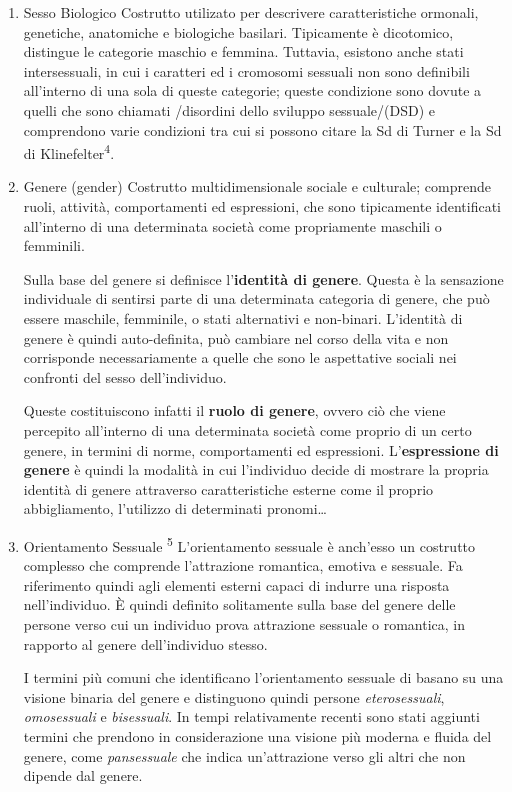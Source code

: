 \documentclass[11pt]{article}
\makeatletter
\newcommand{\cslcitation}[2]
 {\protect\hyper@linkstart{cite}{citeproc_bib_item_#1}#2\hyper@linkend}
\makeatother
\begin{document}
\begin{enumerate}
\item Sesso Biologico
\label{sec:org762db31}
Costrutto utilizato per descrivere caratteristiche ormonali, genetiche, anatomiche e biologiche basilari.
Tipicamente è dicotomico, distingue le categorie maschio e femmina.
Tuttavia, esistono anche stati intersessuali, in cui i caratteri ed i cromosomi sessuali non sono definibili all'interno di una sola di queste categorie; queste condizione sono dovute a quelli che sono chiamati /disordini dello sviluppo sessuale/(DSD) e comprendono varie condizioni tra cui si possono citare la Sd di Turner e la Sd di Klinefelter\textsuperscript{\cslcitation{4}{4}}.
\item Genere (gender)
\label{sec:org4d9569c}
Costrutto multidimensionale sociale e culturale; comprende ruoli, attività, comportamenti ed espressioni, che sono tipicamente identificati all'interno di una determinata società come propriamente maschili o femminili.

Sulla base del genere si definisce l'\textbf{identità di genere}.
Questa è la sensazione individuale di sentirsi parte di una determinata categoria di genere, che può essere maschile, femminile, o stati alternativi e non-binari.
L'identità di genere è quindi auto-definita, può cambiare nel corso della vita e non corrisponde necessariamente a quelle che sono le aspettative sociali nei confronti del sesso dell'individuo.

Queste costituiscono infatti il \textbf{ruolo di genere}, ovvero ciò che viene percepito all'interno di una determinata società come proprio di un certo genere, in termini di norme, comportamenti ed espressioni.
L'\textbf{espressione di genere} è quindi la modalità in cui l'individuo decide di mostrare la propria identità di genere attraverso caratteristiche esterne come il proprio abbigliamento, l'utilizzo di determinati pronomi\ldots{}
\item Orientamento Sessuale \textsuperscript{\cslcitation{5}{5}}
\label{sec:org50bc6a9}
L'orientamento sessuale è anch'esso un costrutto complesso che comprende l'attrazione romantica, emotiva e sessuale.
Fa riferimento quindi agli elementi esterni capaci di indurre una risposta nell'individuo.
È quindi definito solitamente sulla base del genere delle persone verso cui un individuo prova attrazione sessuale o romantica, in rapporto al genere dell'individuo stesso.

I termini più comuni che identificano l'orientamento sessuale di basano su una visione binaria del genere e distinguono quindi persone \emph{eterosessuali}, \emph{omosessuali} e \emph{bisessuali}.
In tempi relativamente recenti sono stati aggiunti termini che prendono in considerazione una visione più moderna e fluida del genere, come \emph{pansessuale} che indica un'attrazione verso gli altri che non dipende dal genere.


\end{enumerate}
\end{document}
